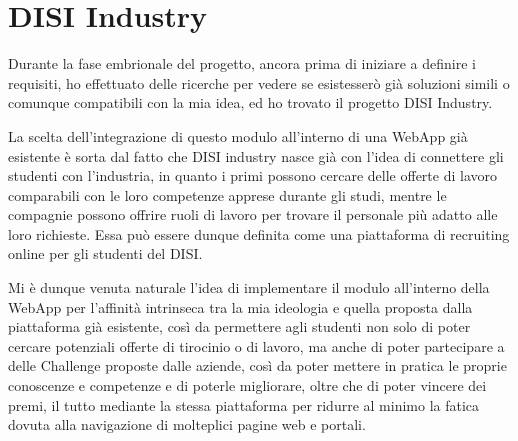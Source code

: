 \section{DISI Industry}
\label{sec:context}
Durante la fase embrionale del progetto, ancora prima di iniziare a definire i requisiti, ho effettuato delle ricerche per vedere se esistesserò già soluzioni simili o comunque compatibili con la mia idea, ed ho trovato il progetto DISI Industry.


La scelta dell'integrazione di questo modulo all'interno di una WebApp già esistente è sorta dal fatto che DISI industry nasce già con l'idea di connettere gli studenti con l'industria, in quanto i primi possono cercare delle offerte di lavoro comparabili con le loro competenze apprese durante gli studi, mentre le compagnie possono offrire ruoli di lavoro per trovare il personale più adatto alle loro richieste. Essa può essere dunque definita come una piattaforma di recruiting online per gli studenti del DISI. \cite{industry}

Mi è dunque venuta naturale l'idea di implementare il modulo all'interno della WebApp per l'affinità intrinseca tra la mia ideologia e quella proposta dalla piattaforma già esistente, così da permettere agli studenti non solo di poter cercare potenziali offerte di tirocinio o di lavoro, ma anche di poter partecipare a delle Challenge proposte dalle aziende, così da poter mettere in pratica le proprie conoscenze e competenze e di poterle migliorare, oltre che di poter vincere dei premi, il tutto mediante la stessa piattaforma per ridurre al minimo la fatica dovuta alla navigazione di molteplici pagine web e portali. 



